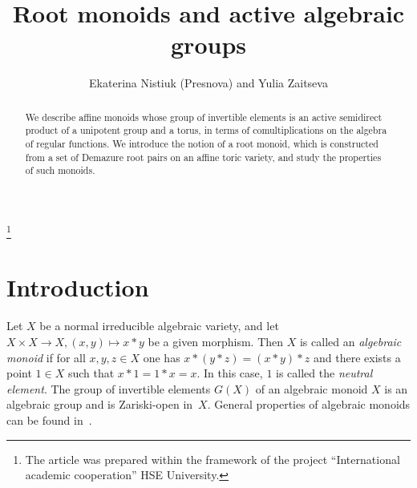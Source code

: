 \documentclass[a4paper, 11pt]{amsart}
\theoremstyle{plain}
\theoremstyle{remark}
\theoremstyle{definition}
\begin{document}
	
	\title[ROOT MONOIDS AND ACTIVE ALGEBRAIC GROUPS]{Root monoids and active algebraic groups}
	\author{Ekaterina Nistiuk (Presnova) and Yulia Zaitseva}
	\address{HSE University, Faculty of Computer Science, Pokrovsky Boulvard 11, Moscow, 109028 Russia}
	\address{HSE University, Faculty of Computer Science, Pokrovsky Boulvard 11, Moscow, 109028 Russia}

	\thanks{The article was prepared within the framework of the project ``International academic cooperation'' HSE University.}
	

\begin{abstract}
	We describe affine monoids whose group of invertible elements is an active semidirect product of a unipotent group and a torus, in terms of comultiplications on the algebra of regular functions. We introduce the notion of a root monoid, which is constructed from a set of Demazure root pairs on an affine toric variety, and study the properties of such monoids.
\end{abstract}

\maketitle

\section{Introduction}
Let $X$ be a normal irreducible algebraic variety, and let $X \times X \rightarrow X, (x, y) \mapsto x * y$ be a given morphism. Then $X$ is called an \textit{algebraic monoid} if for all $x, y, z \in X$ one has $x * (y * z) = (x * y) * z$ and there exists a point $1 \in X$ such that $x * 1 = 1 * x = x$. In this case, $1$ is called the \textit{neutral element}. The group of invertible elements $G(X)$ of an algebraic monoid $X$ is an algebraic group and is Zariski-open in~$X$. General properties of algebraic monoids can be found in~\cite{Br-1, Br-2, Pu, Re, Ri1, Ri2, Vin}.
\end{document}

